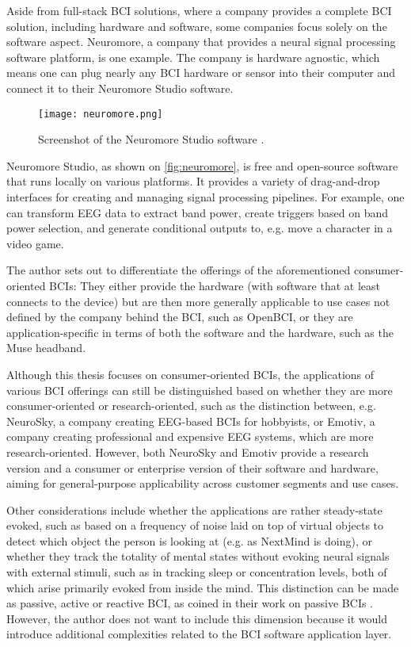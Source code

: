 Aside from full-stack BCI solutions, where a company provides a complete BCI solution, including hardware and software, some companies focus solely on the software aspect. Neuromore, a company that provides a neural signal processing software platform, is one example. The company is hardware agnostic, which means one can plug nearly any BCI hardware or sensor into their computer and connect it to their Neuromore Studio software.

\begin{figure}[ht]
  \centering
  \texttt{[image: neuromore.png]}
  \caption{Screenshot of the Neuromore Studio software \citep{neuromore_neuromore_nodate}.}
  \label{fig:neuromore}
\end{figure}

Neuromore Studio, as shown on \autoref{fig:neuromore}, is free and open-source software that runs locally on various platforms. It provides a variety of drag-and-drop interfaces for creating and managing signal processing pipelines. For example, one can transform EEG data to extract band power, create triggers based on band power selection, and generate conditional outputs to, e.g. move a character in a video game.

The author sets out to differentiate the offerings of the aforementioned consumer-oriented BCIs: They either provide the hardware (with software that at least connects to the device) but are then more generally applicable to use cases not defined by the company behind the BCI, such as OpenBCI, or they are application-specific in terms of both the software and the hardware, such as the Muse headband.

Although this thesis focuses on consumer-oriented BCIs, the applications of various BCI offerings can still be distinguished based on whether they are more consumer-oriented or research-oriented, such as the distinction between, e.g. NeuroSky, a company creating EEG-based BCIs for hobbyists, or Emotiv, a company creating professional and expensive EEG systems, which are more research-oriented. However, both NeuroSky and Emotiv provide a research version and a consumer or enterprise version of their software and hardware, aiming for general-purpose applicability across customer segments and use cases.

Other considerations include whether the applications are rather steady-state evoked, such as based on a frequency of noise laid on top of virtual objects to detect which object the person is looking at (e.g. as NextMind is doing), or whether they track the totality of mental states without evoking neural signals with external stimuli, such as in tracking sleep or concentration levels, both of which arise primarily evoked from inside the mind. This distinction can be made as passive, active or reactive BCI, as \citeauthor{alimardani_passive_2020} coined in their work on passive BCIs \citep{alimardani_passive_2020}. However, the author does not want to include this dimension because it would introduce additional complexities related to the BCI software application layer.

